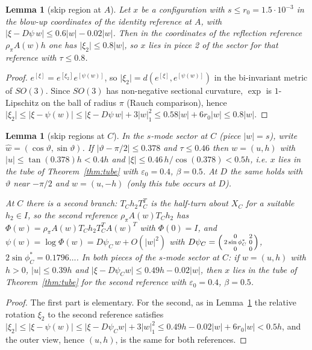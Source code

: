 \documentclass[11pt]{amsart}
\newtheorem{lemma}[theorem]{Lemma}
\theoremstyle{definition}
\newcommand{\abs}[1]{\lvert #1\rvert}
\begin{document}
\begin{lemma}[skip region at $A$]\label{lem:skipA}
Let $x$ be a configuration with $s\le r_0=1.5\cdot10^{-3}$ in the blow-up coordinates of the identity reference at $A$, with
$\abs{\xi-D\psi\,w}\le0.6\abs w-0.02\abs w$. Then in the coordinates of the reflection reference
$\rho_\pi A(w)h$ one has $\abs{\xi_2}\le0.8\abs w$, so $x$ lies in piece 2 of the sector for that reference with $\tau\le0.8$.
\end{lemma}
\begin{proof}
$e^{[\xi]}=e^{[\xi_2]}e^{[\psi(w)]}$, so $\abs{\xi_2}=d(e^{[\xi]},e^{[\psi(w)]})$ in the bi-invariant metric of $SO(3)$. Since
$SO(3)$ has non-negative sectional curvature, $\exp$ is $1$-Lipschitz on the ball of radius $\pi$ (Rauch comparison), hence
$\abs{\xi_2}\le\abs{\xi-\psi(w)}\le\abs{\xi-D\psi\,w}+3\abs w_1^2\le0.58\abs w+6r_0\abs w\le0.8\abs w$.
\end{proof}

\begin{lemma}[skip regions at $C$]\label{lem:skipC}
In the $s$-mode sector at $C$ (piece $\abs w=s$), write $\hat w=(\cos\vartheta,\sin\vartheta)$. If
$\abs{\vartheta-\pi/2}\le0.378$ and $\tau\le0.46$ then $w=(u,h)$ with $\abs u\le\tan(0.378)h<0.4h$ and
$\abs\xi\le0.46\,h/\cos(0.378)<0.5h$, i.e. $x$ lies in the tube of Theorem~\ref{thm:tube} with
$\varepsilon_0=0.4$, $\beta=0.5$. At $D$ the same holds with $\vartheta$ near $-\pi/2$ and $w=(u,-h)$ (only this tube occurs
at $D$).

At $C$ there is a second branch: $T_Ch_2T_C^{T}$ is the half-turn about $X_C$ for a suitable $h_2\in I$, so the second
reference $\rho_\pi A(w)T_Ch_2$ has $\Phi(w)=\rho_\pi A(w)T_Ch_2T_C^TA(w)^T$ with $\Phi(0)=I$, and
$\psi(w)=\log\Phi(w)=D\psi_C\,w+O(\abs w^2)$ with $D\psi_C=\begin{psmallmatrix}0&2\\2\sin\phi^*_C&0\\0&0\end{psmallmatrix}$,
$2\sin\phi^*_C=0.1796\ldots$. In both pieces of the $s$-mode sector at $C$: if $w=(u,h)$ with $h>0$, $\abs u\le0.39h$ and
$\abs{\xi-D\psi_Cw}\le0.49h-0.02\abs w$, then $x$ lies in the tube of Theorem~\ref{thm:tube} for the second reference
with $\varepsilon_0=0.4$, $\beta=0.5$.
\end{lemma}
\begin{proof}
The first part is elementary. For the second, as in Lemma~\ref{lem:skipA} the relative rotation $\xi_2$ to the second
reference satisfies $\abs{\xi_2}\le\abs{\xi-\psi(w)}\le\abs{\xi-D\psi_Cw}+3\abs w_1^2\le0.49h-0.02\abs w+6r_0\abs w<0.5h$,
and the outer view, hence $(u,h)$, is the same for both references.
\end{proof}
\end{document}
